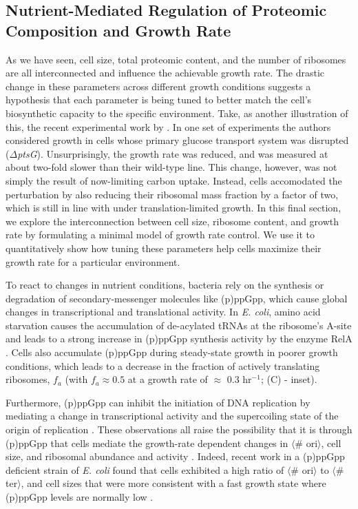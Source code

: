 \subsection{Nutrient-Mediated Regulation of Proteomic Composition and Growth Rate}
As we have seen, cell size, total proteomic content, and the number of ribosomes
are all interconnected and influence the achievable growth rate. The drastic
change in these parameters across different growth conditions suggests a
hypothesis that each parameter is being tuned to better match the cell's biosynthetic
capacity to the specific environment.  Take, as another illustration of this,
the recent experimental work by \cite{dai2016}. In one set of experiments the
authors considered growth in cells whose primary glucose transport system was
disrupted ($\Delta$\textit{ptsG}). Unsurprisingly, the growth rate was reduced,
and was measured at about two-fold slower than their wild-type line.  This
change, however, was not simply the result of now-limiting carbon uptake.
Instead, cells accomodated the perturbation by also reducing their ribosomal
mass fraction by a factor of two, which is still in line with
 under translation-limited growth. In this
final section, we explore the interconnection between cell size, ribosome content, and
growth rate by formulating a minimal model of growth rate control. We use it to
quantitatively show how tuning these parameters help cells maximize their growth
rate for a particular environment.

To react to changes in nutrient conditions, bacteria rely on the synthesis or
degradation of secondary-messenger molecules  like (p)ppGpp, which cause global
changes in transcriptional and translational activity. In \textit{E. coli},
amino acid starvation causes the accumulation of de-acylated tRNAs at the
ribosome's A-site and leads to a strong increase in (p)ppGpp synthesis activity
by the enzyme RelA \citep{hauryliuk2015}. Cells also accumulate (p)ppGpp  during
steady-state growth in poorer growth conditions, which leads to a decrease in
the fraction of actively translating ribosomes, $f_a$  (with $f_a \approx 0.5$
at a growth rate of $\approx$ 0.3 hr$^{-1}$; (C) - inset).

Furthermore, (p)ppGpp can inhibit the initiation of DNA replication by mediating
a change in transcriptional activity and the supercoiling state of the origin of
replication \citep{kraemer2019}. These observations all raise the possibility
that it is through (p)ppGpp that cells mediate the growth-rate dependent changes
in $\langle$\# ori$\rangle$, cell size, and ribosomal abundance and activity
\citep{zhu2019, Buke2020}. Indeed, recent work in a (p)ppGpp deficient strain of
\textit{E. coli} found that cells exhibited a high ratio of $\langle$\#
ori$\rangle$ to $\langle$\# ter$\rangle$, and cell sizes that were more
consistent with a fast growth state where (p)ppGpp levels are normally low
\citep{fernandezcoll2020}.


